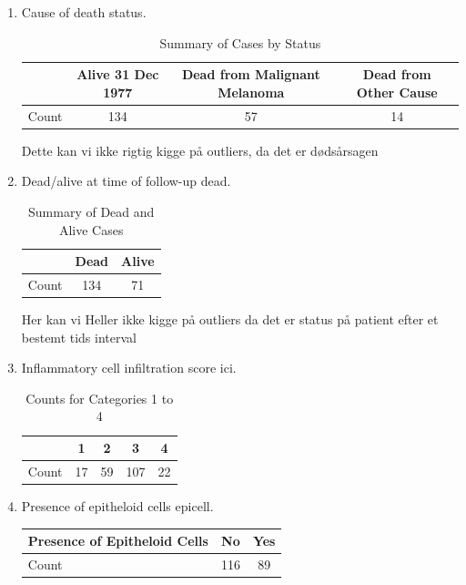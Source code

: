 \begin{enumerate}
\item Cause of death status. \newline
\begin{table}[h]
    \centering
    \begin{tabular}{|l|c|c|c|}
        \hline
        & Alive 31 Dec 1977 & Dead from Malignant Melanoma & Dead from Other Cause \\
        \hline
        Count & 134 & 57 & 14 \\
        \hline
    \end{tabular}
    \caption{Summary of Cases by Status}
    \label{tab:summary}
\end{table}
Dette kan vi ikke rigtig kigge på outliers, da det er dødsårsagen 
\item Dead/alive at time of follow-up dead. \newline
\begin{table}[h!]
    \centering
    \begin{tabular}{|l|c|c|}
        \hline
        & Dead & Alive \\
        \hline
        Count & 134 & 71 \\
        \hline
    \end{tabular}
    \caption{Summary of Dead and Alive Cases}
    \label{tab:dead_alive}
\end{table}
Her kan vi Heller ikke kigge på outliers da det er status på patient efter et bestemt tids interval
\item Inflammatory cell infiltration score ici. \newline
\begin{table}[h!]
    \centering
    \begin{tabular}{|c|c|c|c|c|}
        \hline
        & 1 & 2 & 3 & 4 \\
        \hline
        Count & 17 & 59 & 107 & 22 \\
        \hline
    \end{tabular}
    \caption{Counts for Categories 1 to 4}
    \label{tab:categories}
\end{table}
\item Presence of epitheloid cells epicell. \newline
\begin{table}[h!]
    \centering
    \begin{tabular}{|l|c|c|}
        \hline
        Presence of Epitheloid Cells & No & Yes \\
        \hline
        Count & 116 & 89 \\

\end{tabular}
\end{table}
\end{enumerate}
